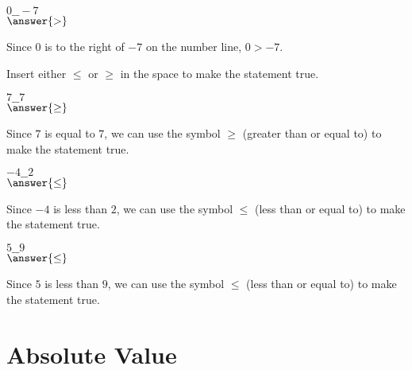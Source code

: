 \documentclass{ximera}
\begin{document}
\begin{problem}
$0\_\_-7$\\
$\answer{>}$

\begin{feedback}
Since $0$ is to the right of $-7$ on the number line, $0 > -7$.
\end{feedback}

\end{problem}



Insert either $\leq$ or $\geq$ in the space to make the statement true.

\begin{problem}
$7\_\_7$\\
$\answer{\geq}$

\begin{feedback}
Since $7$ is equal to $7$, we can use the symbol $\geq$ (greater than or equal to) to make the statement true.
\end{feedback}

\end{problem}

\begin{problem}
$-4\_\_2$\\
$\answer{\leq}$

\begin{feedback}
Since $-4$ is less than $2$, we can use the symbol $\leq$ (less than or equal to) to make the statement true.
\end{feedback}

\end{problem}

\begin{problem}
$5\_\_9$\\
$\answer{\leq}$

\begin{feedback}
Since $5$ is less than $9$, we can use the symbol $\leq$ (less than or equal to) to make the statement true.
\end{feedback}

\end{problem}



\section*{Absolute Value}
\end{document}
